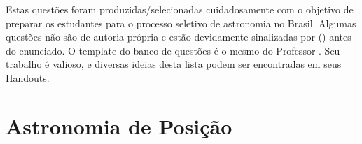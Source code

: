 \documentclass[11pt]{article}
\begin{document}

Estas questões foram produzidas/selecionadas cuidadosamente com o objetivo de preparar os estudantes para o processo seletivo de astronomia no Brasil. Algumas questões não são de autoria própria e estão devidamente sinalizadas por () antes do enunciado. O template do banco de questões é o mesmo do Professor . Seu trabalho é valioso, e diversas ideias desta lista podem ser encontradas em seus Handouts.




\section{Astronomia de Posição}
\end{document}
